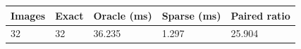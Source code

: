 \begin{tabular}{lllll}
\hline
Images & Exact & Oracle (ms) & Sparse (ms) & Paired ratio \\
\hline
32 & 32 & 36.235 & 1.297 & 25.904 \\
\hline
\end{tabular}
